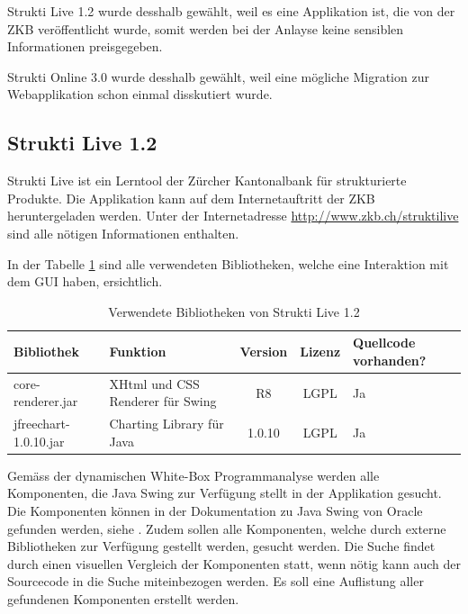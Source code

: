   Strukti Live 1.2 wurde desshalb gewählt, weil es eine Applikation ist, die
  von der ZKB veröffentlicht wurde, somit werden bei der Anlayse keine
  sensiblen Informationen preisgegeben.
  
  Strukti Online 3.0 wurde desshalb gewählt, weil eine mögliche Migration zur
  Webapplikation schon einmal disskutiert wurde.
  
  \subsection{Strukti Live 1.2}
  
  Strukti Live ist ein Lerntool der Zürcher Kantonalbank für strukturierte
  Produkte. Die Applikation kann auf dem Internetauftritt der ZKB
  heruntergeladen werden. Unter der Internetadresse
  \url{http://www.zkb.ch/struktilive} sind alle nötigen Informationen
  enthalten.
  
  In der Tabelle \ref{tab:bibliothekenStruktiLive} sind alle verwendeten
  Bibliotheken, welche eine Interaktion mit dem \ac{GUI} haben, ersichtlich.
  \newline
  
  \begin{table}[ht]
    \begin{center}
      \begin{tabular}{lp{4.5cm}ccp{2cm}}
        \toprule
        Bibliothek & Funktion & Version & Lizenz & Quellcode vorhanden?\\
        \midrule
        core-renderer.jar & XHtml und CSS Renderer für Swing & R8 & LGPL & Ja\\
        jfreechart-1.0.10.jar & Charting Library für Java & 1.0.10 & LGPL & Ja\\
        \bottomrule
      \end{tabular}
      \caption{Verwendete Bibliotheken von Strukti Live 1.2}
      \label{tab:bibliothekenStruktiLive}
    \end{center}
  \end{table}
  
  Gemäss der dynamischen White-Box Programmanalyse werden alle Komponenten, die
  Java Swing zur Verfügung stellt in der Applikation gesucht. Die Komponenten
  können in der Dokumentation zu Java Swing von Oracle gefunden werden, siehe
  \cite{SwingComponentsByOracle}. Zudem sollen alle Komponenten, welche durch
  externe Bibliotheken zur Verfügung gestellt werden, gesucht werden. Die
  Suche findet durch einen visuellen Vergleich der Komponenten statt, wenn
  nötig kann auch der Sourcecode in die Suche miteinbezogen werden. Es soll eine
  Auflistung aller gefundenen Komponenten erstellt werden.
  
